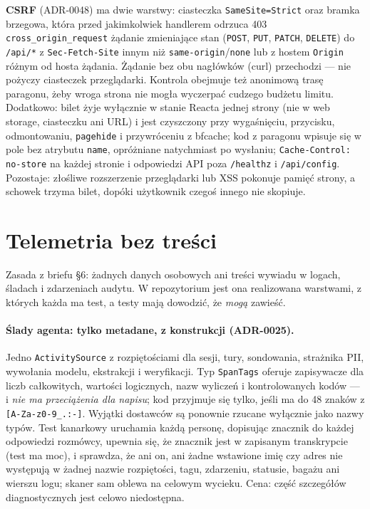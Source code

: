 \textbf{CSRF} (ADR-0048) ma dwie warstwy: ciasteczka \texttt{SameSite=Strict} oraz
bramka brzegowa, która przed jakimkolwiek handlerem odrzuca 403
\texttt{cross\_origin\_request} żądanie zmieniające stan (\texttt{POST}, \texttt{PUT},
\texttt{PATCH}, \texttt{DELETE}) do \texttt{/api/*} z \texttt{Sec-Fetch-Site}
innym niż \texttt{same-origin}/\texttt{none} lub z hostem \texttt{Origin} różnym od hosta
żądania. Żądanie bez obu nagłówków (curl) przechodzi --- nie pożyczy ciasteczek
przeglądarki. Kontrola obejmuje też anonimową trasę paragonu, żeby wroga strona nie
mogła wyczerpać cudzego budżetu limitu. Dodatkowo: bilet żyje wyłącznie w stanie
Reacta jednej strony (nie w web storage, ciasteczku ani URL) i jest czyszczony przy
wygaśnięciu, przycisku, odmontowaniu, \texttt{pagehide} i przywróceniu z bfcache;
kod z paragonu wpisuje się w pole bez atrybutu \texttt{name}, opróżniane natychmiast po
wysłaniu; \texttt{Cache-Control: no-store} na każdej stronie i odpowiedzi API poza
\texttt{/healthz} i \texttt{/api/config}. Pozostaje: złośliwe rozszerzenie
przeglądarki lub XSS pokonuje pamięć strony, a schowek trzyma bilet, dopóki
użytkownik czegoś innego nie skopiuje.

\section{Telemetria bez treści}
\label{sec:p3-telemetria}

Zasada z briefu §6: żadnych danych osobowych ani treści wywiadu w logach, śladach
i zdarzeniach audytu. W repozytorium jest ona realizowana warstwami, z których
każda ma test, a testy mają dowodzić, że \emph{mogą} zawieść.

\paragraph{Ślady agenta: tylko metadane, z konstrukcji (ADR-0025).} Jedno
\texttt{ActivitySource} z rozpiętościami dla sesji, tury, sondowania, strażnika PII,
wywołania modelu, ekstrakcji i weryfikacji. Typ \texttt{SpanTags} oferuje
zapisywacze dla liczb całkowitych, wartości logicznych, nazw wyliczeń i kontrolowanych
kodów --- i \emph{nie ma przeciążenia dla napisu}; kod przyjmuje się tylko, jeśli ma
do 48 znaków z \texttt{[A-Za-z0-9\_.:-]}. Wyjątki dostawców są ponownie rzucane
wyłącznie jako nazwy typów. Test kanarkowy uruchamia każdą personę, dopisując
znacznik do każdej odpowiedzi rozmówcy, upewnia się, że znacznik jest w zapisanym
transkrypcie (test ma moc), i sprawdza, że ani on, ani żadne wstawione imię
czy adres nie występują w żadnej nazwie rozpiętości, tagu, zdarzeniu, statusie,
bagażu ani wierszu logu; skaner sam oblewa na celowym wycieku. Cena: część
szczegółów diagnostycznych jest celowo niedostępna.

